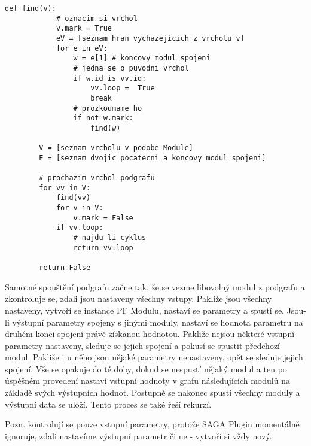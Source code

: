 \newpage
\begin{lstlisting}[label=findLoop,caption={Hledání cyklu v podgrafu},morekeywords={find}]
        def find(v):
        	# oznacim si vrchol
            v.mark = True
            eV = [seznam hran vychazejicich z vrcholu v]            
            for e in eV:
                w = e[1] # koncovy modul spojeni
                # jedna se o puvodni vrchol
                if w.id is vv.id:
                    vv.loop =  True
                    break
                # prozkoumame ho
                if not w.mark:
                    find(w)
        
        V = [seznam vrcholu v podobe Module]
        E = [seznam dvojic pocatecni a koncovy modul spojeni]

        # prochazim vrchol podgrafu
        for vv in V:
            find(vv)
            for v in V:
                v.mark = False
            if vv.loop:
            	# najdu-li cyklus
                return vv.loop

        return False
\end{lstlisting}

Samotné spouštění podgrafu začne tak, že se vezme libovolný modul z podgrafu a zkontroluje se, zdali jsou nastaveny všechny vstupy. Pakliže jsou všechny nastaveny, vytvoří se instance PF Modulu, nastaví se parametry a spustí se. Jsou-li výstupní parametry spojeny s jinými moduly, nastaví se hodnota parametru na druhém konci spojení právě získanou hodnotou. Pakliže nejsou některé vstupní parametry nastaveny, sleduje se jejich spojení a pokusí se spustit předchozí modul. Pakliže i u něho jsou nějaké parametry nenastaveny, opět se sleduje jejich spojení. Vše se opakuje do té doby, dokud se nespustí nějaký modul a ten po úspěšném provedení nastaví vstupní hodnoty v grafu následujících modulů na základě svých výstupních hodnot. Postupně se nakonec spustí všechny moduly a výstupní data se uloží. Tento proces se také řeší rekurzí.

Pozn. kontrolují se pouze vstupní parametry, protože SAGA Plugin momentálně ignoruje, zdali nastavíme výstupní parametr či ne - vytvoří si vždy nový.